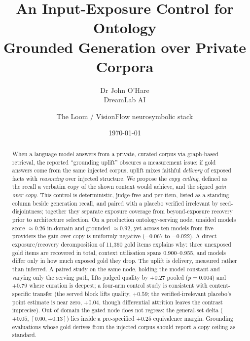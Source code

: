 \documentclass[10pt,twocolumn]{article}
\title{\vspace{-1.2cm}\bfseries An Input-Exposure Control for Ontology\\
Grounded Generation over Private Corpora}
\author{Dr John O'Hare\\ \small DreamLab AI \and \small The Loom / VisionFlow neurosymbolic stack}
\date{\today}
\begin{document}
\maketitle

\begin{abstract}
\noindent
When a language model answers from a private, curated corpus via graph-based retrieval, the reported ``grounding uplift'' obscures a measurement issue: if gold answers come from the same injected corpus, uplift mixes faithful \emph{delivery} of exposed facts with \emph{reasoning} over injected structure. We propose the \emph{copy ceiling}, defined as the recall a verbatim copy of the shown context would achieve, and the signed \emph{gain over copy}. This control is deterministic, judge-free and per-item, listed as a standing column beside generation recall, and paired with a placebo verified irrelevant by seed-disjointness; together they separate exposure coverage from beyond-exposure recovery prior to architecture selection. On a production ontology-serving node, unaided models score $\approx0.26$ in-domain and grounded $\approx0.92$, yet across ten models from five providers the gain over copy is uniformly negative ($-0.067$ to $-0.022$). A direct exposure/recovery decomposition of 11{,}360 gold items explains why: three unexposed gold items are recovered in total, context utilisation spans 0.900--0.955, and models differ only in how much exposed gold they drop. The uplift is delivery, measured rather than inferred. A paired study on the same node, holding the model constant and varying only the serving path, lifts judged quality by $+0.27$ pooled ($p=0.004$) and $+0.79$ where curation is deepest; a four-arm control study is consistent with content-specific transfer (the served block lifts quality, $+0.59$; the verified-irrelevant placebo's point estimate is near zero, $+0.04$, though differential attrition leaves the contrast imprecise). Out of domain the gated node does not regress: the general-set delta ($+0.05$, $[0.00,+0.13]$) lies inside a pre-specified $\pm0.25$ equivalence margin. Grounding evaluations whose gold derives from the injected corpus should report a copy ceiling as standard.
\end{abstract}
\end{document}
